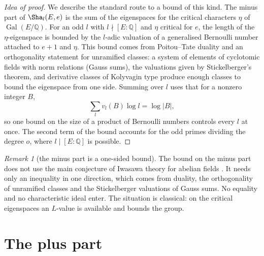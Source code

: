\documentclass[11pt]{amsbook}
\theoremstyle{plain}
\theoremstyle{definition}
\theoremstyle{remark}
\newtheorem{remark}[theorem]{Remark}
\numberwithin{equation}{section}
\numberwithin{figure}{chapter}
\numberwithin{table}{chapter}
\newcommand{\Q}{\mathbb{Q}}
\newcommand{\Gal}{\operatorname{Gal}}
\begin{document}
\begin{proof}[Idea of proof]
We describe the standard route to a bound of this kind.
The minus part of $\Sha_l(E,e)$ is the sum of the
eigenspaces for the critical characters $\eta$ of $\Gal(E/\Q)$. For an
odd $l$ with $l\nmid[E:\Q]$ and $\eta$ critical for $e$, the length
of the $\eta$-eigenspace is bounded by the $l$-adic valuation of a
generalised Bernoulli number attached to $e+1$ and $\eta$. This bound
comes from Poitou--Tate duality and an orthogonality statement for
unramified classes: a system of elements of cyclotomic fields with
norm relations (Gauss sums), the valuations given by Stickelberger's
theorem, and derivative classes of Kolyvagin type produce enough
classes to bound the eigenspace from one side. Summing over $l$ uses
that for a nonzero integer $B$,
\[
\sum_l v_l(B)\log l=\log|B|,
\]
so one bound on the size of a product of Bernoulli numbers controls
every $l$ at once. The second term of the bound accounts for the odd
primes dividing the degree $o$, where $l\mid[E:\Q]$ is possible.
\end{proof}

\begin{remark}[the minus part is a one-sided bound]
\label{rem:minus-mech}
The bound on the minus part does not use the main conjecture of
Iwasawa theory for abelian fields \cite{MazurWiles1984}. It needs only
an inequality in one direction, which comes from duality, the
orthogonality of unramified classes and the Stickelberger valuations of
Gauss sums. No equality and no characteristic ideal enter. The
situation is classical: on the critical eigenspaces an $L$-value is
available and bounds the group.
\end{remark}

\section{The plus part}
\end{document}
